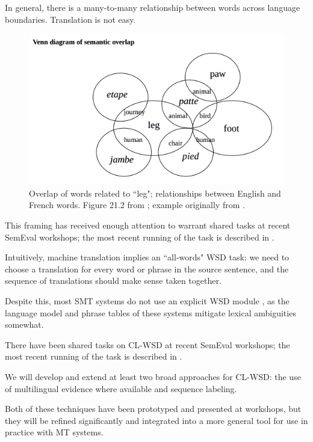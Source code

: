 In general, there is a many-to-many relationship between words across language
boundaries. Translation is not easy.

\begin{figure}
  \includegraphics[width=12cm]{hutchins-leg-etc.png}
  \caption{Overlap of words related to ``leg"; relationships between English
  and French words. Figure 21.2 from \protect\cite{slp1}; example originally
  from \protect\cite[Chapter 6]{hutchins1992introduction}.}
  \label{fig:leg}
\end{figure}






This framing has received enough attention to warrant shared tasks at recent
SemEval workshops; the most recent running of the task is described in
\cite{task10}.

Intuitively, machine translation implies an ``all-words" WSD task: we need to
choose a translation for every word or phrase in the source sentence, and the
sequence of translations should make sense taken together.





Despite this, most SMT systems do not use an explicit WSD module
\cite{wsdchap3}, as the language model and phrase tables of these systems
mitigate lexical ambiguities somewhat.


There have been shared tasks on CL-WSD at recent SemEval workshops; the most
recent running of the task is described in \cite{task10}.


We will develop and extend at least two broad approaches for CL-WSD: the use
of multilingual evidence where available and sequence labeling.

Both of these techniques have been prototyped and presented at workshops, but
they will be refined significantly and integrated into a more general tool for
use in practice with MT systems.

